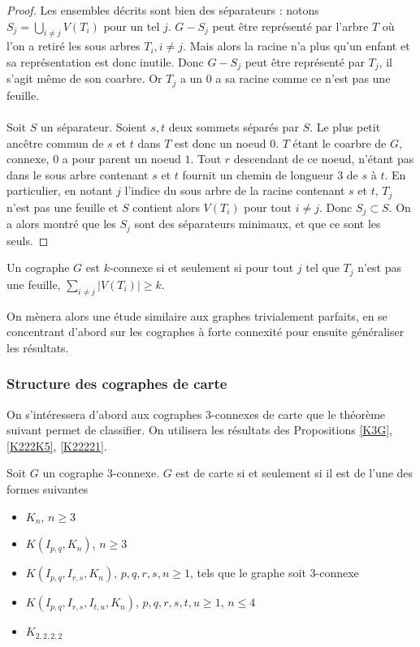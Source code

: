 \documentclass{scrartcl}
\begin{document}
\begin{flushleft}
\begin{proof}
    Les ensembles décrits sont bien des séparateurs : notons $\displaystyle S_j = \bigcup_{i \neq j} V(T_i)$ pour un tel $j$. $G - S_j$ peut être
    représenté par l'arbre $T$ où l'on a retiré les sous arbres $T_i, i \neq j$. Mais alors la racine n'a plus qu'un enfant et sa représentation est donc
    inutile. Donc $G - S_j$ peut être représenté par $T_j$, il s'agit même de son coarbre. Or $T_j$ a un $0$ a sa racine comme ce n'est pas une feuille.
    \\~\\
    Soit $S$ un séparateur. Soient $s, t$ deux sommets séparés par $S$. Le plus petit ancêtre commun de $s$ et $t$ dans $T$
    est donc un noeud $0$. $T$ étant le coarbre de $G$, connexe, $0$ a pour parent un noeud $1$. Tout $r$ descendant de ce noeud, n'étant pas dans le
    sous arbre contenant $s$ et $t$ fournit un chemin de longueur $3$ de $s$ à $t$. En particulier, en notant $j$ l'indice du sous arbre de la racine
    contenant $s$ et $t$, $T_j$ n'est pas une feuille et $S$ contient alors $V(T_i)$ pour tout $i \neq j$. Donc $S_j \subset S$. On a
    alors montré que les $S_j$ sont des séparateurs minimaux, et que ce sont les seuls.
\end{proof}

\begin{cor}\label{coarbrekconn}
    Un cographe $G$ est $k$-connexe si et seulement si pour tout $j$ tel que $T_j$ n'est pas une feuille, $\sum_{i \neq j} |V(T_i)| \geq k$.
\end{cor}

On mènera alors une étude similaire aux graphes trivialement parfaits, en se concentrant d'abord sur les cographes à forte connexité pour ensuite
généraliser les résultats.

\subsubsection{Structure des cographes de carte}

On s'intéressera d'abord aux cographes $3$-connexes de carte que le théorème suivant permet de classifier. On utilisera les résultats
des Propositions \ref{K3G}, \ref{K222K5}, \ref{K22221}.

\begin{theorem}\label{cograph3conn}
    Soit $G$ un cographe $3$-connexe. $G$ est de carte si et seulement si il est de l'une des formes suivantes
    \begin{itemize}
        \item $K_n$, $n \geq 3$
        \item $K(I_{p,q}, K_n)$, $n \geq 3$
        \item $K(I_{p,q}, I_{r,s}, K_n)$, $p,q,r,s,n \geq 1$, tels que le graphe soit $3$-connexe
        \item $K(I_{p,q}, I_{r,s}, I_{t,u}, K_n)$, $p,q,r,s,t,u \geq 1$, $n \leq 4$
        \item $K_{2,2,2,2}$
    \end{itemize}
\end{theorem}


\end{flushleft}
\end{document}
